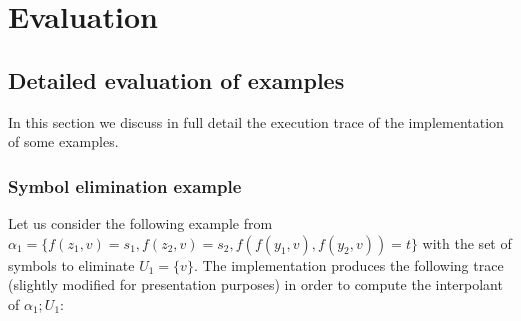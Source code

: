 \section{Evaluation}

\subsection{Detailed evaluation of examples}

In this section we discuss in full detail the execution trace
of the implementation of some examples. 

\subsubsection{Symbol elimination example}

Let us consider the following example from \cite{KAPUR2017} 
$\alpha_1 = \{f(z_1, v) = s_1, f(z_2, v) = s_2, f(f(y_1, v), f(y_2, v)) = t\}$
with the set of symbols to eliminate $U_1 = \{v\}$. The implementation produces the following
trace (slightly modified for presentation purposes) in order to compute 
the interpolant of $\alpha_1; U_1$:






